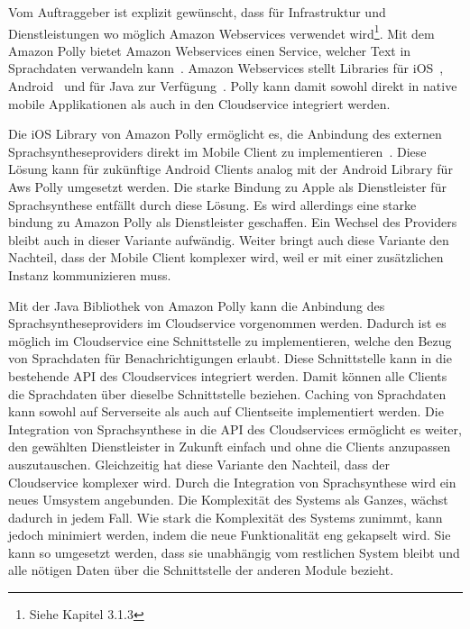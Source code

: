 Vom Auftraggeber ist explizit gewünscht, dass für Infrastruktur und Dienstleistungen wo möglich Amazon Webservices verwendet wird\footnote{Siehe Kapitel 3.1.3}.
Mit dem Amazon Polly bietet Amazon Webservices einen Service, welcher Text in Sprachdaten verwandeln kann~\cite{aws_polly}.
Amazon Webservices stellt Libraries für iOS~\cite{aws_polly_ios}, Android~\cite{aws_polly_sdks} und für Java zur Verfügung~\cite{aws_polly_java}.
Polly kann damit sowohl direkt in native mobile Applikationen als auch in den Cloudservice integriert werden.

Die iOS Library von Amazon Polly ermöglicht es, die Anbindung des externen Sprachsyntheseproviders direkt im Mobile Client zu implementieren~\cite{aws_polly_ios}.
Diese Lösung kann für zukünftige Android Clients analog mit der Android Library für Aws Polly umgesetzt werden.
Die starke Bindung zu Apple als Dienstleister für Sprachsynthese entfällt durch diese Lösung.
Es wird allerdings eine starke bindung zu Amazon Polly als Dienstleister geschaffen.
Ein Wechsel des Providers bleibt auch in dieser Variante aufwändig.
Weiter bringt auch diese Variante den Nachteil, dass der Mobile Client komplexer wird, weil er mit einer zusätzlichen Instanz kommunizieren muss.

Mit der Java Bibliothek von Amazon Polly kann die Anbindung des Sprachsyntheseproviders im Cloudservice vorgenommen werden.
Dadurch ist es möglich im Cloudservice eine Schnittstelle zu implementieren, welche den Bezug von Sprachdaten für Benachrichtigungen erlaubt.
Diese Schnittstelle kann in die bestehende API des Cloudservices integriert werden.
Damit können alle Clients die Sprachdaten über dieselbe Schnittstelle beziehen.
Caching von Sprachdaten kann sowohl auf Serverseite als auch auf Clientseite implementiert werden.
Die Integration von Sprachsynthese in die API des Cloudservices ermöglicht es weiter, den gewählten Dienstleister in Zukunft einfach und ohne die Clients anzupassen auszutauschen.
Gleichzeitig hat diese Variante den Nachteil, dass der Cloudservice komplexer wird.
Durch die Integration von Sprachsynthese wird ein neues Umsystem angebunden.
Die Komplexität des Systems als Ganzes, wächst dadurch in jedem Fall.
Wie stark die Komplexität des Systems zunimmt, kann jedoch minimiert werden, indem die neue Funktionalität eng gekapselt wird.
Sie kann so umgesetzt werden, dass sie unabhängig vom restlichen System bleibt und alle nötigen Daten über die Schnittstelle der anderen Module bezieht.

